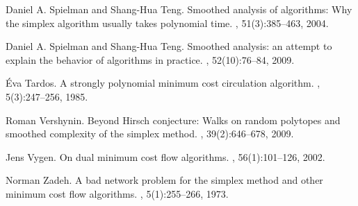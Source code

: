 \documentclass[11pt]{article}
\begin{document}
\begin{thebibliography}{99}
Daniel A. Spielman and Shang-Hua Teng.
\newblock Smoothed analysis of algorithms: Why the simplex algorithm usually
  takes polynomial time.
, 51(3):385--463, 2004.

Daniel A. Spielman and Shang-Hua Teng.
\newblock Smoothed analysis: an attempt to explain the behavior of algorithms
  in practice.
, 52(10):76--84, 2009.

{\'E}va Tardos.
\newblock A strongly polynomial minimum cost circulation algorithm.
, 5(3):247--256, 1985.

Roman Vershynin.
\newblock Beyond Hirsch conjecture: Walks on random polytopes and smoothed
  complexity of the simplex method.
, 39(2):646--678, 2009.

Jens Vygen.
\newblock On dual minimum cost flow al\-go\-ri\-thms.
, 56(1):101--126,
  2002.

Norman Zadeh.
\newblock A bad network problem for the simplex method and other minimum cost
  flow algorithms.
, 5(1):255--266, 1973.

\end{thebibliography}
\end{document}
